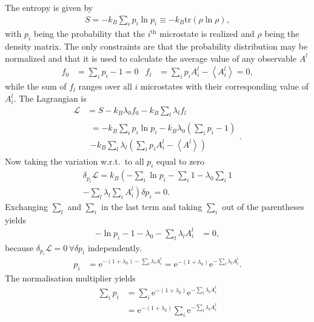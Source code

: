 \documentclass[a4paper,10pt]{article}
\numberwithin{equation}{section}
\begin{document}
\begin{multicols}{2}
The entropy is given by
\begin{align} 
  S = -k_B\sum_{i}^{}p_i \ln p_i\equiv -k_B\text{tr}\left(\rho \ln \rho \right)
,\end{align} 
with $p_i$ being the probability that the $i^{\text{th}}$ microstate is realized and $\rho $ being the density matrix.
The only constraints are that the probability distribution may be normalized and that it is used to calculate the average value of any observable $A^l$ 
\begin{align} 
  f_0 &= \sum_{i}^{}p_i-1=0 & f_l &= \sum_{i}^{}p_iA^l_i-\left\langle A^l_i\right\rangle =0
,\end{align} 
while the sum of $f_l$ ranges over all $i$ microstates with their corresponding value of $A_i^l$.
The Lagrangian is
\begin{align} 
  \mathcal{L} &= S - k_B\lambda _0f_0 - k_B\sum_{l}^{}\lambda _lf_l\\
              &\begin{multlined}
              = -k_B\sum_{i}^{}p_i\ln p_i - k_B\lambda _0\left(\sum_{i}^{}p_i-1\right) \\- k_B\sum_{l}^{}\lambda _l\left(\sum_{i}^{}p_iA_i^l-\left\langle A^l\right\rangle \right)
              \end{multlined}
.\end{align} 
Now taking the variation w.r.t.\ to all $p_i$ equal to zero
\begin{multline}
  \delta _{p_i}\mathcal{L} = k_B\left(-\sum_{i}^{}\ln p_i - \sum_{i}^{}1 - \lambda _0\sum_{i}^{}1 \right.\\ -\left.\sum_{l}^{}\lambda _l \sum_{i}^{}A_i^l\right)\delta p_i=0
.\end{multline}
Exchanging $\sum_{l}^{}$ and $\sum_{i}^{}$ in the last term and taking $\sum_{i}^{}$ out of the parentheses yields
\begin{align} 
  -\ln p_i - 1 - \lambda _0 - \sum_{l}^{}\lambda _lA^l_i &= 0
,\end{align} 
because $\delta _{p_i}\mathcal{L}=0\,\forall \delta p_i$ independently.
\begin{align} 
  p_i &= \text{e}^{-(1 + \lambda _0) - \sum_{l}^{}\lambda _lA_i^l} = \text{e}^{-(1+\lambda _0)}\text{e}^{-\sum_{l}^{}\lambda _lA_i^l}
.\end{align} 
The normalisation multiplier yields
\begin{align} 
  \sum_{i}^{}p_i &= \sum_{i}^{}\text{e}^{-(1+\lambda _0)}\text{e}^{-\sum_{l}^{}\lambda _lA_i^l}\\
                 &= \text{e}^{-(1+\lambda _0)}\sum_{i}^{}\text{e}^{-\sum_{l}^{}\lambda _lA_i^l}\\

\end{align}
\end{multicols}
\end{document}
